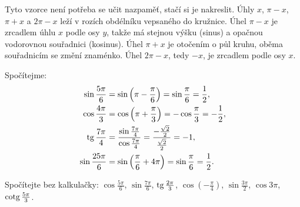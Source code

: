 Tyto vzorce není potřeba se učit nazpaměť, stačí si je nakreslit. Úhly $x$, $\pi - x$, $\pi + x$ a $2\pi - x$ leží v rozích obdélníku vepsaného do kružnice. Úhel $\pi - x$ je zrcadlem úhlu $x$ podle osy $y$, takže má stejnou výšku (sinus) a opačnou vodorovnou souřadnici (kosinus). Úhel $\pi + x$ je otočením o půl kruhu, oběma souřadnicím se změní znaménko. Úhel $2\pi - x$, tedy $-x$, je zrcadlem podle osy $x$.

\begin{center}
\end{center}

\begin{example}
  Spočítejme:
  \begin{align*}
    \sin\frac{5\pi}{6} &= \sin\left(\pi - \frac{\pi}{6}\right) = \sin\frac{\pi}{6} = \frac{1}{2},\\
    \cos\frac{4\pi}{3} &= \cos\left(\pi + \frac{\pi}{3}\right) = -\cos\frac{\pi}{3} = -\frac{1}{2},\\
    \operatorname{tg}\frac{7\pi}{4} &= \frac{\sin\frac{7\pi}{4}}{\cos\frac{7\pi}{4}} = \frac{-\frac{\sqrt{2}}{2}}{\frac{\sqrt{2}}{2}} = -1,\\
    \sin\frac{25\pi}{6} &= \sin\left(\frac{\pi}{6} + 4\pi\right) = \sin\frac{\pi}{6} = \frac{1}{2}.
  \end{align*}
\end{example}

\begin{problem}
  Spočítejte bez kalkulačky: $\cos\frac{5\pi}{6}$, $\sin\frac{7\pi}{6}$, $\operatorname{tg}\frac{2\pi}{3}$, $\cos\left(-\frac{\pi}{4}\right)$, $\sin\frac{3\pi}{2}$, $\cos 3\pi$, $\operatorname{cotg}\frac{5\pi}{3}$.
\end{problem}

